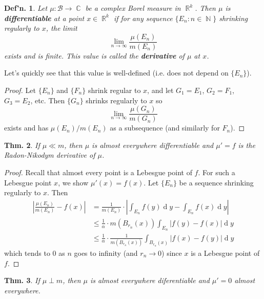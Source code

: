 \documentclass[12pt, a4paper]{book}
\DeclareMathOperator{\N}{\mathbb{N}}
\DeclareMathOperator{\R}{\mathbb{R}}
\DeclareMathOperator{\C}{\mathbb{C}}
\renewcommand{\d}[1]{\ensuremath{\operatorname{d}\!{#1}}} %
\newtheorem{theorem}{Thm.}[section]
\newtheorem{definition}[theorem]{Def'n.}
\theoremstyle{nonumberplain}
\newtheorem{proof}{Proof}
\begin{document}
\begin{definition}
    Let $\mu:\mathcal{B}\to\C$ be a complex Borel measure in $\R^k$.
    Then $\mu$ is \textbf{differentiable} at a point $x\in\R^k$ if for any sequence $\{E_n:n\in\N\}$ shrinking regularly to $x$, the limit
    \[\lim_{n\to\infty}\frac{\mu(E_n)}{m(E_n)}\]
    exists and is finite.
    This value is called the \textbf{derivative} of $\mu$ at $x$.
\end{definition}
Let's quickly see that this value is well-defined (i.e. does not depend on $\{E_n\}$).
\begin{proof}
    Let $\{E_n\}$ and $\{F_n\}$ shrink regular to $x$, and let $G_1=E_1$, $G_2=F_1$, $G_3=E_2$, etc.
    Then $\{G_n\}$ shrinks regularly to $x$ so
    \[\lim_{n\to\infty}\frac{\mu(G_n)}{m(G_n)}\]
    exists and has $\mu(E_n)/m(E_n)$ as a subsequence (and similarly for $F_n$).
\end{proof}
\begin{theorem}
    If $\mu\ll m$, then $\mu$ is almost everywhere differentiable and $\mu'=f$ is the Radon-Nikodym derivative of $\mu$.
\end{theorem}
\begin{proof}
    Recall that almost every point is a Lebesgue point of $f$.
    For such a Lebesgue point $x$, we show $\mu'(x)=f(x)$.
    Let $\{E_n\}$ be a sequence shrinking regularly to $x$.
    Then
    \begin{align*}
        \left\lvert\frac{\mu(E_n)}{m(E_n)}-f(x)\right\rvert &= \frac{1}{m(E_n)}\cdot\left\lvert\int_{E_n}f(y)\d{y}-\int_{E_n}f(x)\d{y}\right\rvert\\
                                                            &\leq \frac{1}{\alpha}\cdot m(B_{r_n}(x))\int_{E_n}|f(y)-f(x)|\d{y}\\
                                                            &\leq\frac{1}{\alpha}\cdot\frac{1}{m(B_{r_n}(x))}\int_{B_{r_n}(x)}|f(x)-f(y)|\d{y}
    \end{align*}
    which tends to $0$ as $n$ goes to infinity (and $r_n\to 0$) since $x$ is a Lebesgue point of $f$.
\end{proof}
\begin{theorem}
    If $\mu\perp m$, then $\mu$ is almost everywhere diferentiable and $\mu'=0$ almost everywhere.
\end{theorem}
\end{document}
